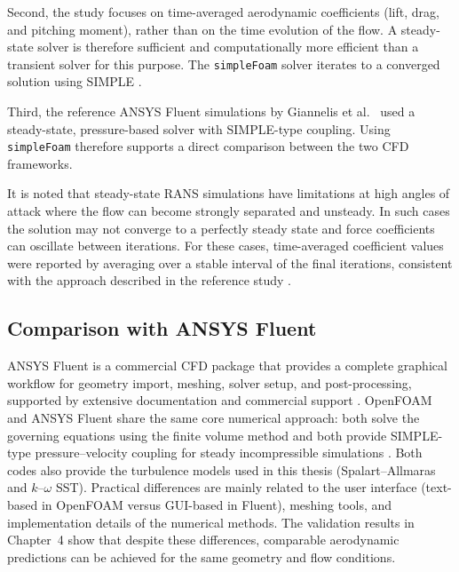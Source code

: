 Second, the study focuses on time-averaged aerodynamic coefficients (lift, drag, and pitching moment), rather than on the time evolution of the flow. A steady-state solver is therefore sufficient and computationally more efficient than a transient solver for this purpose. The \texttt{simpleFoam} solver iterates to a converged solution using SIMPLE \cite{OpenFOAMsimpleFoamGuide}.

Third, the reference ANSYS Fluent simulations by Giannelis et al.~\cite{Giannelis2023SSAMGen5} used a steady-state, pressure-based solver with SIMPLE-type coupling. Using \texttt{simpleFoam} therefore supports a direct comparison between the two CFD frameworks.

It is noted that steady-state RANS simulations have limitations at high angles of attack where the flow can become strongly separated and unsteady. In such cases the solution may not converge to a perfectly steady state and force coefficients can oscillate between iterations. For these cases, time-averaged coefficient values were reported by averaging over a stable interval of the final iterations, consistent with the approach described in the reference study \cite{Giannelis2023SSAMGen5}.

\subsection*{Comparison with ANSYS Fluent}
ANSYS Fluent is a commercial CFD package that provides a complete graphical workflow for geometry import, meshing, solver setup, and post-processing, supported by extensive documentation and commercial support \cite{AnsysFluentTheoryGuide}. OpenFOAM and ANSYS Fluent share the same core numerical approach: both solve the governing equations using the finite volume method and both provide SIMPLE-type pressure--velocity coupling for steady incompressible simulations \cite{VersteegMalalasekera2007CFD,OpenFOAMsimpleFoamGuide,AnsysFluentTheoryGuide}. Both codes also provide the turbulence models used in this thesis (Spalart--Allmaras and $k$--$\omega$ SST). Practical differences are mainly related to the user interface (text-based in OpenFOAM versus GUI-based in Fluent), meshing tools, and implementation details of the numerical methods. The validation results in Chapter~4 show that despite these differences, comparable aerodynamic predictions can be achieved for the same geometry and flow conditions.